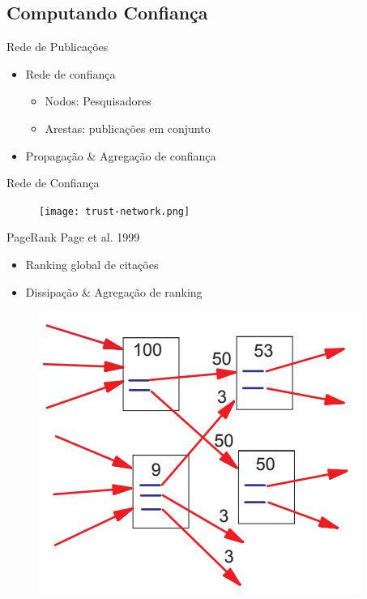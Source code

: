 \documentclass{beamer}
\begin{document}
\subsection{Computando Confiança}

\begin{frame}{Rede de Publicações}{}

  \begin{itemize}
    \item Rede de confiança
    \begin{itemize}
      \item Nodos: Pesquisadores
      \item Arestas: publicações em conjunto
    \end{itemize}
    \item Propagação \& Agregação de confiança
  \end{itemize}
  
\end{frame}

\begin{frame}{Rede de Confiança}{}
  \begin{figure}[ht]
    \texttt{[image: trust-network.png]}
  \end{figure}
\end{frame}

\begin{frame}{PageRank}
  {Page et al. 1999}

  \begin{itemize}
    \item Ranking global de citações
    \item Dissipação \& Agregação de ranking 
  \end{itemize}

  \begin{figure}[ht]
    \includegraphics[width=.6\textwidth]{pagerank.png}
  \end{figure}

\end{frame}
\end{document}

